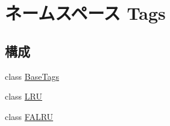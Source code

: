 \hypertarget{namespaceTags}{
\section{ネームスペース Tags}
\label{namespaceTags}
}
\subsection*{構成}
\begin{DoxyCompactItemize}
\item 
class \hyperlink{classTags_1_1BaseTags}{BaseTags}
\item 
class \hyperlink{classTags_1_1LRU}{LRU}
\item 
class \hyperlink{classTags_1_1FALRU}{FALRU}
\end{DoxyCompactItemize}
